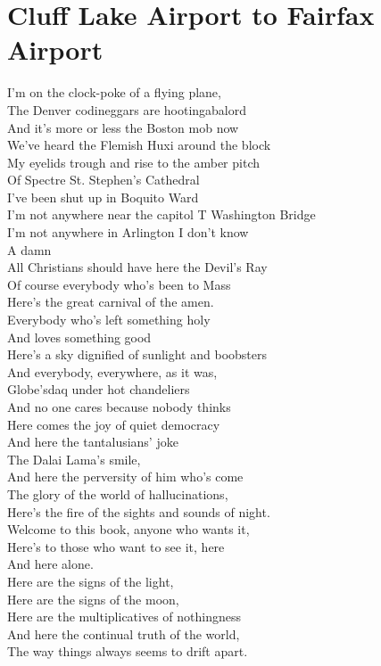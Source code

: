 \documentclass[smalldemyvopaper,11pt,twoside,onecolumn,openright,extrafontsizes]{memoir}
\begin{document}
\chapter{Cluff Lake Airport to Fairfax Airport}
I'm on the clock-poke of a flying plane,
\\The Denver codineggars are hootingabalord
\\And it's more or less the Boston mob now
\\We've heard the Flemish Huxi around the block
\\My eyelids trough and rise to the amber pitch
\\Of Spectre St. Stephen's Cathedral
\\I've been shut up in Boquito Ward
\\I'm not anywhere near the capitol T Washington Bridge
\\I'm not anywhere in Arlington I don't know
\\A damn
\\All Christians should have here the Devil's Ray
\\Of course everybody who's been to Mass
\\Here's the great carnival of the amen.
\\Everybody who's left something holy
\\And loves something good
\\Here's a sky dignified of sunlight and boobsters
\\And everybody, everywhere, as it was,
\\Globe'sdaq under hot chandeliers
\\And no one cares because nobody thinks
\\Here comes the joy of quiet democracy
\\And here the tantalusians' joke
\\The Dalai Lama's smile,
\\And here the perversity of him who's come
\\The glory of the world of hallucinations,
\\Here's the fire of the sights and sounds of night.
\\Welcome to this book, anyone who wants it,
\\Here's to those who want to see it, here
\\And here alone.
\\Here are the signs of the light,
\\Here are the signs of the moon,
\\Here are the multiplicatives of nothingness
\\And here the continual truth of the world,
\\The way things always seems to drift apart.
\end{document}
